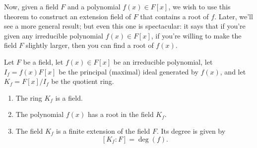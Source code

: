 \documentclass[math1530-lecture-notes]{subfiles}
\begin{document}
Now, given a field $F$ and a polynomial $f(x)\in F[x]$, we wish to use this theorem to construct an
extension field of $F$ that contains a root of $f$. Later, we'll see a more general result; but even
this one is spectacular: it says that if you're given any irreducible polynomial $f(x)\in F[x]$, if
you're willing to make the field $F$ slightly larger, then you can find a root of $f(x)$.

\begin{theorem}{}
  Let $F$ be a field, let $f(x)\in F[x]$ be an irreducible polynomial, let $I_f=f(x)F[x]$ be the
  principal (maximal) ideal generated by $f(x)$, and let $K_f=F[x] / I_f$ be the quotient ring.
  \begin{enumerate}
    \item The ring $K_f$ is a field.
    \item The polynomial $f(x)$ has a root in the field $K_f$.
    \item The field $K_f$ is a finite extension of the field $F$. Its degree is given by \[
        \left[K_f : F\right]=\deg(f)
    .\] 
  \end{enumerate}
\end{theorem}
\end{document}
